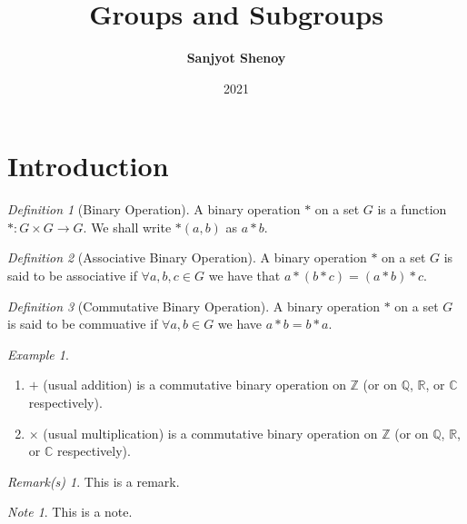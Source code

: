\documentclass[11pt]{article}
\title{Groups and Subgroups}
\author{\textbf{Sanjyot Shenoy}}
\date{2021}
\theoremstyle{plain}%
\theoremstyle{definition}
\theoremstyle{remark}
\newtheorem*{note}{Note}
\theoremstyle{breakthm}
\theoremstyle{breakdefn}
\newtheorem{defn}{Definition}[section]
\newtheorem{bexmp}{Example}[section]
\theoremstyle{breakrem}
\newtheorem*{rem}{Remark(s)}
\newcommand{\R}{{\mathbb R}}
\newcommand{\Z}{{\mathbb Z}}
\newcommand{\Q}{{\mathbb Q}}
\newcommand{\C}{{\mathbb C}}
\begin{document}
	\maketitle
	\tableofcontents
	\section{Introduction}
	\begin{defn}[Binary Operation]
		A binary operation $*$ on a set $G$ is a function $*:G\times G\to G$. We shall write $*(a,b)$ as $a*b$. 
	\end{defn}
	\begin{defn}[Associative Binary Operation]
		A binary operation $*$ on a set $G$ is said to be associative if $\forall a,b,c\in G$ we have that $a*(b*c)=(a*b)*c$.
	\end{defn}
	\begin{defn}[Commutative Binary Operation]
		A binary operation $*$ on a set $G$ is said to be commuative if $\forall a,b\in G$ we have $a*b=b*a$.
	\end{defn}
	\begin{bexmp}
		\leavevmode \vspace{-\baselineskip}
		\begin{enumerate}
			\item $+$ (usual addition) is a commutative binary operation on $\Z$ (or on $\Q$, $\R$, or $\C$ respectively). 
			\item $\times $ (usual multiplication) is a commutative binary operation on $\Z$ (or on $\Q$, $\R$, or $\C$ respectively).
		\end{enumerate}
	\end{bexmp}
	\begin{rem}This is a remark.	
	\end{rem}
	\begin{note}
		This is a note.
	\end{note}

	
\end{document}
